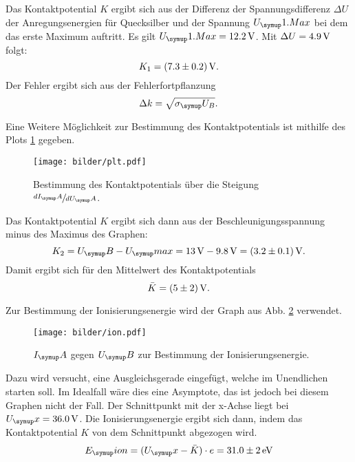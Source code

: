 Das Kontaktpotential $K$ ergibt sich aus der Differenz der Spannungsdifferenz $\Delta U$
der Anregungsenergien für Quecksilber und der Spannung $U_\su{1.Max}$ bei dem das
erste Maximum auftritt. Es gilt $U_\su{1.Max} = 12.2\Volt$. Mit $\Delta U = 4.9\,\si{\volt}$
folgt:
\begin{equation}
  K_1 = (7.3\pm0.2)\,\si{\volt}.
\end{equation}
Der Fehler ergibt sich aus der Fehlerfortpflanzung
\begin{equation}
  \Delta k = \sqrt{\sigma_\su{U_B}}.
\end{equation}

Eine Weitere Möglichkeit zur Bestimmung des Kontaktpotentials ist mithilfe
des Plots \ref{fig:plot} gegeben.
\begin{figure}
  \centering
  \texttt{[image: bilder/plt.pdf]}
  \caption{Bestimmung des Kontaktpotentials über die Steigung $\sfrac{dI_\su{A}}{dU_\su{A}}$.}
  \label{fig:plot}
\end{figure}
Das Kontaktpotential $K$ ergibt sich dann aus der Beschleunigungsspannung minus
des Maximus des Graphen:
\begin{equation}
  K_2 = U_\su{B} - U_\su{max} = 13\Volt - 9.8\Volt = (3.2\pm0.1)\Volt.
\end{equation}
Damit ergibt sich für den Mittelwert des Kontaktpotentials
\begin{equation}
  \bar{K} = (5 \pm 2) \,\si{\volt}.
\end{equation}

Zur Bestimmung der Ionisierungsenergie wird der Graph aus Abb. \ref{fig:ion}
verwendet.
\begin{figure}
  \centering
  \texttt{[image: bilder/ion.pdf]}
  \caption{$I_\su{A}$ gegen $U_\su{B}$ zur Bestimmung der Ionisierungsenergie.}
  \label{fig:ion}
\end{figure}
Dazu wird versucht, eine Ausgleichsgerade eingefügt, welche im Unendlichen starten
soll. Im Idealfall wäre dies eine Asymptote, das ist jedoch bei diesem Graphen nicht
der Fall. Der Schnittpunkt mit der x-Achse liegt bei $U_\su{x} = 36.0 \Volt$.
Die Ionisierungsenergie ergibt sich dann, indem das Kontaktpotential $K$ von
dem Schnittpunkt abgezogen wird.
\begin{equation}
  E_\su{ion} = (U_\su{x}-\bar{K}) \cdot e = 31.0\pm2\eV
\end{equation}
